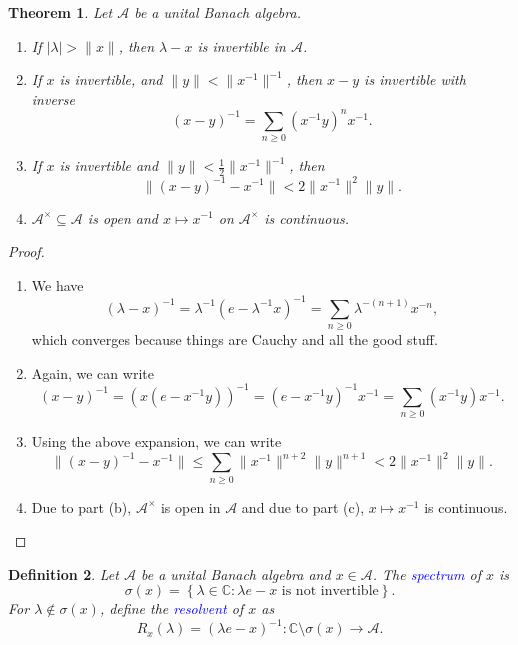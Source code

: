 \documentclass[11pt]{article}
\theoremstyle{thmstyle}
\newtheorem{theorem}{Theorem}[section]
\theoremstyle{defstyle}
\newtheorem{definition}[theorem]{Definition}
\newcommand{\bbC}{\mathbb{C}}
\newcommand{\calA}{\mathcal{A}} %
\newcommand{\define}[1]{\textcolor{blue}{\textit{#1}}}
\renewcommand{\le}{\leqslant}
\renewcommand{\ge}{\geqslant}
\begin{document}
\begin{theorem}
    Let $\calA$ be a unital Banach algebra. 
    \begin{enumerate}[label=(\alph*)]
        \item If $|\lambda| > \|x\|$, then $\lambda - x$ is invertible in $\calA$.
        \item If $x$ is invertible, and $\|y\| < \|x^{-1}\|^{-1}$, then $x - y$ is invertible with inverse 
        \begin{equation*}
            (x - y)^{-1} = \sum_{n\ge 0}(x^{-1}y)^nx^{-1}.
        \end{equation*}
        \item If $x$ is invertible and $\|y\| < \frac{1}{2}\|x^{-1}\|^{-1}$, then 
        \begin{equation*}
            \|(x - y)^{-1} - x^{-1}\| < 2\|x^{-1}\|^2\|y\|.
        \end{equation*}
        \item $\calA^\times\subseteq\calA$ is open and $x\mapsto x^{-1}$ on $\calA^\times$ is continuous.
    \end{enumerate}
\end{theorem}
\begin{proof}
\begin{enumerate}[label=(\alph*)]
\item We have 
\begin{equation*}
    (\lambda - x)^{-1} = \lambda^{-1}\left(e - \lambda^{-1}x\right)^{-1} = \sum_{n\ge 0}\lambda^{-(n + 1)}x^{-n},
\end{equation*}
which converges because things are Cauchy and all the good stuff.
\item Again, we can write 
\begin{equation*}
    (x - y)^{-1} = \left(x(e - x^{-1}y)\right)^{-1} = (e - x^{-1}y)^{-1}x^{-1} = \sum_{n\ge 0}(x^{-1}y)x^{-1}.
\end{equation*}
\item Using the above expansion, we can write 
\begin{equation*}
    \|(x - y)^{-1} - x^{-1}\|\le\sum_{n\ge 0}\|x^{-1}\|^{n + 2}\|y\|^{n + 1} < 2\|x^{-1}\|^2\|y\|.
\end{equation*}
\item Due to part (b), $\calA^\times$ is open in $\calA$ and due to part (c), $x\mapsto x^{-1}$ is continuous.
\end{enumerate}
\end{proof}

\begin{definition}
    Let $\calA$ be a unital Banach algebra and $x\in\calA$. The \define{spectrum} of $x$ is 
    \begin{equation*}
        \sigma(x) = \left\{\lambda\in\bbC\colon \lambda e - x \text{ is not invertible}\right\}.
    \end{equation*}
    For $\lambda\notin\sigma(x)$, define the \define{resolvent} of $x$ as 
    \begin{equation*}
        R_x(\lambda) = (\lambda e - x)^{-1}: \bbC\setminus\sigma(x)\to\calA.
    \end{equation*}
\end{definition}
\end{document}
